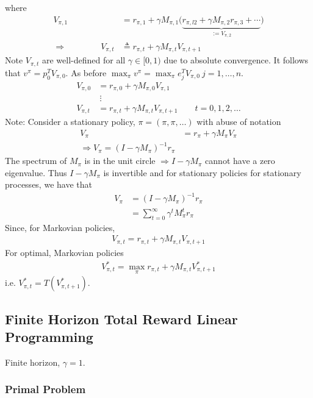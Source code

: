 \documentclass[]{article}
\begin{document}
where
\begin{align}
V_{\pi,1} & = r_{\pi,1} + \gamma M_{\pi,1} \Big(
\underbrace{r_{\pi,l2} + \gamma M_{\pi,2} r_{\pi,3} + \cdots}_{:=V_{\pi,2}} \Big) \\
\Rightarrow \qquad \qquad V_{\pi,t} &  \triangleq r_{\pi,t} + \gamma M_{\pi,t} V_{\pi,t+1}
\end{align}
Note $V_{\pi,t}$ are well-defined for all $\gamma \in [0,1)$ due to absolute convergence.  It follows that $v^\pi = p_0^T V_{\pi,0}$. As before $\max_\pi v^\pi = \max_\pi e_j^T V_{\pi,0} \ j=1,\dots,n$.  
\begin{align}
V_{\pi,0} & = r_{\pi,0} + \gamma M_{\pi,0} V_{\pi,1} \\
& \ \vdots \\
V_{\pi,t} & = r_{\pi,t} + \gamma M_{\pi,t} V_{\pi,t+1} \qquad t=0,1,2,\dots
\end{align}
Note: Consider a stationary policy, $\pi = (\pi,\pi,\dots)$ with abuse of notation
\begin{align}
V_\pi & = r_\pi + \gamma M_\pi V_\pi \\
\Rightarrow V_\pi = (I-\gamma M_\pi)^{-1} r_\pi
\end{align}
The spectrum of $M_\pi$ is in the unit circle $\Rightarrow I- \gamma M_\pi$ cannot have a zero eigenvalue.  Thus $I-\gamma M_\pi$ is invertible and for stationary policies for stationary processes, we have that
\begin{align}
V_\pi & = (I-\gamma M_\pi)^{-1} r_\pi \\
& = \sum_{t=0}^\infty \gamma^t M_\pi^t r_\pi
\end{align}
Since, for Markovian policies, 
\begin{align}
V_{\pi,t} = r_{\pi,t} + \gamma M_{\pi,t} V_{\pi,t+1}
\end{align}
For optimal, Markovian policies
\begin{align}
V^*_{\pi,t} = \max_\pi r_{\pi,t} + \gamma M_{\pi,t} V_{\pi,t+1}^*
\end{align}
i.e. $V_{\pi,t}^* = T(V_{\pi,t+1}^*)$.

\subsection*{Finite Horizon Total Reward Linear Programming}

Finite horizon, $\gamma = 1$. \\
\subsubsection*{Primal Problem}
\end{document}
